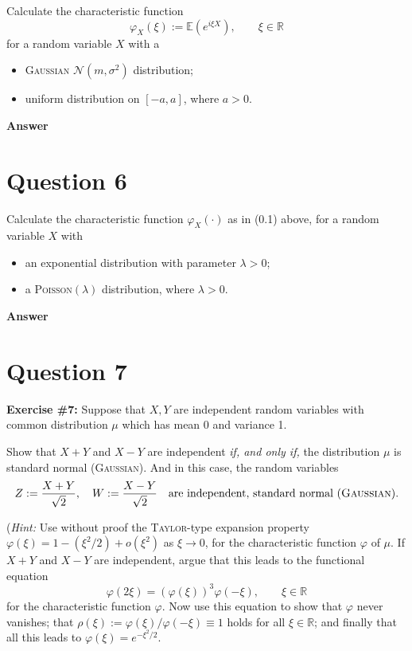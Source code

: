 \documentclass[letterpaper]{article}
\begin{document}
		Calculate the characteristic function
		\begin{equation}
			\varphi_X(\xi) := \mathbb{E}\!\left(e^{i\xi X}\right), \qquad \xi \in \mathbb{R} \tag{0.1}
		\end{equation}
		for a random variable $X$ with a
		\begin{itemize}
			\item[(i)] \textsc{Gaussian} $\mathcal{N}(m, \sigma^2)$ distribution;
			\item[(i)] uniform distribution on $[-a, a]$, where $a > 0$.
		\end{itemize}
		
		\textbf{Answer}
		
		\clearpage
		
		\section{Question 6}
		
		Calculate the characteristic function $\varphi_X(\cdot)$ as in (0.1) above, for a random variable $X$ with
		\begin{itemize}
			\item[(i)] an exponential distribution with parameter $\lambda > 0$;
			\item[(ii)] a \textsc{Poisson}$(\lambda)$ distribution, where $\lambda > 0$.
		\end{itemize}
		
		\textbf{Answer}
		
		\clearpage
		
		\section{Question 7}
		
		\textbf{Exercise \#7:} Suppose that $X, Y$ are independent random variables with common distribution $\mu$ which has mean 0 and variance 1.
		
		\indent Show that $X + Y$ and $X - Y$ are independent \textit{if, and only if,} the distribution $\mu$ is standard normal (\textsc{Gaussian}). And in this case, the random variables
		\[
		Z := \frac{X+Y}{\sqrt{2}}, \quad W := \frac{X-Y}{\sqrt{2}} \quad \text{are independent, standard normal (\textsc{Gaussian}).}
		\]
		
		(\textit{Hint:} Use without proof the \textsc{Taylor}-type expansion property $\varphi(\xi) = 1 - \left(\xi^2/2\right) + o(\xi^2)$ as $\xi \to 0$, for the characteristic function $\varphi$ of $\mu$.
		If $X + Y$ and $X - Y$ are independent, argue that this leads to the functional equation
		\[
		\varphi(2\xi) = \left(\varphi(\xi)\right)^3 \varphi(-\xi), \qquad \xi \in \mathbb{R}
		\]
		for the characteristic function $\varphi$. Now use this equation to show that $\varphi$ never vanishes; that $\rho(\xi) := \varphi(\xi)/\varphi(-\xi) \equiv 1$ holds for all $\xi \in \mathbb{R}$; and finally that all this leads to $\varphi(\xi) = e^{-\xi^2/2}$.
		
\end{document}
